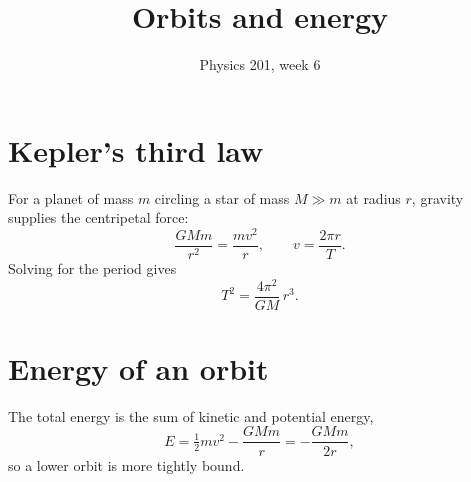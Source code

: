 \documentclass[11pt]{article}
\title{Orbits and energy}
\author{Physics 201, week 6}
\date{}
\begin{document}
\maketitle
\section{Kepler's third law}
For a planet of mass $m$ circling a star of mass $M \gg m$ at radius $r$, gravity supplies the centripetal force:
\begin{equation}
  \frac{G M m}{r^2} = \frac{m v^2}{r}, \qquad v = \frac{2\pi r}{T}.
\end{equation}
Solving for the period gives
\begin{equation}
  T^2 = \frac{4\pi^2}{G M}\, r^3 .
\end{equation}
\section{Energy of an orbit}
The total energy is the sum of kinetic and potential energy,
\begin{equation}
  E = \tfrac12 m v^2 - \frac{G M m}{r} = -\frac{G M m}{2r},
\end{equation}
so a lower orbit is more tightly bound.
\end{document}
